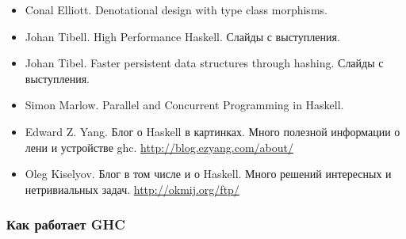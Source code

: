 \begin{itemize}
\item Conal Elliott. Denotational design with type class morphisms.

\item Johan Tibell. High Performance Haskell. Слайды с выступления. 

\item Johan Tibel. Faster persistent data structures through hashing. 
      Слайды с выступления.

\item Simon Marlow. Parallel and Concurrent Programming in Haskell.

\item Edward Z. Yang. Блог о Haskell в картинках. Много
    полезной информации о лени и устройстве ghc.
    \url{http://blog.ezyang.com/about/}

\item Oleg Kiselyov. Блог в том числе и о Haskell. Много решений интересных
    и нетривиальных задач. 
\url{http://okmij.org/ftp/}

\end{itemize}

\subsubsection{Как работает GHC}

